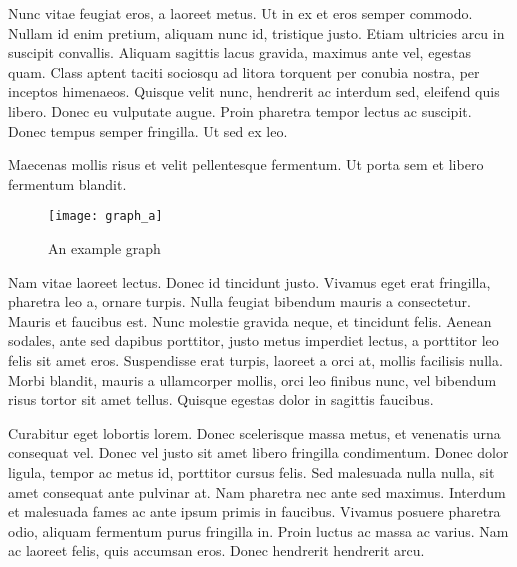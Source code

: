 Nunc vitae feugiat eros, a laoreet metus. Ut in ex et eros semper commodo. Nullam id enim pretium, aliquam nunc id, tristique justo. Etiam ultricies arcu in suscipit convallis. Aliquam sagittis lacus gravida, maximus ante vel, egestas quam. Class aptent taciti sociosqu ad litora torquent per conubia nostra, per inceptos himenaeos. Quisque velit nunc, hendrerit ac interdum sed, eleifend quis libero. Donec eu vulputate augue. Proin pharetra tempor lectus ac suscipit. Donec tempus semper fringilla. Ut sed ex leo.

Maecenas mollis risus et velit pellentesque fermentum. Ut porta sem et libero fermentum blandit.
\begin{figure}[h]
\centering
\texttt{[image: graph\_a]}
\caption{An example graph}
\label{fig:x cubed graph}
\end{figure}
Nam vitae laoreet lectus. Donec id tincidunt justo. Vivamus eget erat fringilla, pharetra leo a, ornare turpis. Nulla feugiat bibendum mauris a consectetur. Mauris et faucibus est. Nunc molestie gravida neque, et tincidunt felis. Aenean sodales, ante sed dapibus porttitor, justo metus imperdiet lectus, a porttitor leo felis sit amet eros. Suspendisse erat turpis, laoreet a orci at, mollis facilisis nulla. Morbi blandit, mauris a ullamcorper mollis, orci leo finibus nunc, vel bibendum risus tortor sit amet tellus. Quisque egestas dolor in sagittis faucibus.

Curabitur eget lobortis lorem. Donec scelerisque massa metus, et venenatis urna consequat vel. Donec vel justo sit amet libero fringilla condimentum. Donec dolor ligula, tempor ac metus id, porttitor cursus felis. Sed malesuada nulla nulla, sit amet consequat ante pulvinar at. Nam pharetra nec ante sed maximus. Interdum et malesuada fames ac ante ipsum primis in faucibus. Vivamus posuere pharetra odio, aliquam fermentum purus fringilla in. Proin luctus ac massa ac varius. Nam ac laoreet felis, quis accumsan eros. Donec hendrerit hendrerit arcu.